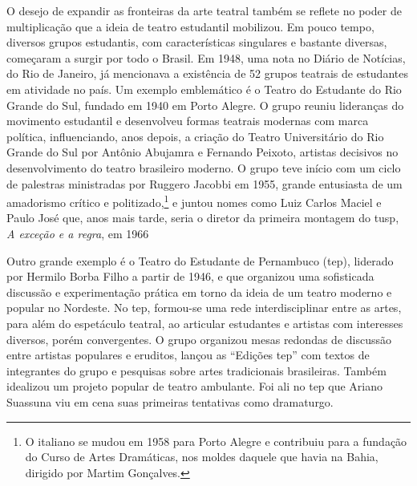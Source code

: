 \subject{Constituição de uma cena estudantil no teatro brasileiro dos anos
1940 e 1950}

O desejo de expandir as fronteiras da arte teatral também se reflete no
poder de multiplicação que a ideia de teatro estudantil mobilizou. Em
pouco tempo, diversos grupos estudantis, com características singulares
e bastante diversas, começaram a surgir por todo o Brasil. Em 1948, uma
nota no Diário de Notícias, do Rio de Janeiro, já mencionava a
existência de 52 grupos teatrais de estudantes em atividade no país. Um
exemplo emblemático é o Teatro do Estudante do Rio Grande do Sul,
fundado em 1940 em Porto Alegre. O grupo reuniu lideranças do movimento
estudantil e desenvolveu formas teatrais modernas com marca política,
influenciando, anos depois, a criação do Teatro Universitário do Rio
Grande do Sul por Antônio Abujamra e Fernando Peixoto, artistas
decisivos no desenvolvimento do teatro brasileiro moderno. O grupo teve
início com um ciclo de palestras ministradas por Ruggero Jacobbi em
1955, grande entusiasta de um amadorismo crítico e
politizado,\footnote{O italiano se mudou em 1958 para Porto Alegre e
  contribuiu para a fundação do Curso de Artes Dramáticas, nos moldes
  daquele que havia na Bahia, dirigido por Martim Gonçalves.} e juntou
nomes como Luiz Carlos Maciel e Paulo José que, anos mais tarde, seria o
diretor da primeira montagem do {\sc tusp}, {\it A exceção e a regra}, em 1966

Outro grande exemplo é o Teatro do Estudante de Pernambuco ({\sc tep}),
liderado por Hermilo Borba Filho a partir de 1946, e que organizou uma
sofisticada discussão e experimentação prática em torno da ideia de um
teatro moderno e popular no Nordeste. No {\sc tep}, formou-se uma rede
interdisciplinar entre as artes, para além do espetáculo teatral, ao
articular estudantes e artistas com interesses diversos, porém
convergentes. O grupo organizou mesas redondas de discussão entre
artistas populares e eruditos, lançou as “Edições {\sc tep}” com textos de
integrantes do grupo e pesquisas sobre artes tradicionais brasileiras.
Também idealizou um projeto popular de teatro ambulante. Foi ali no {\sc tep}
que Ariano Suassuna viu em cena suas primeiras tentativas como
dramaturgo.

